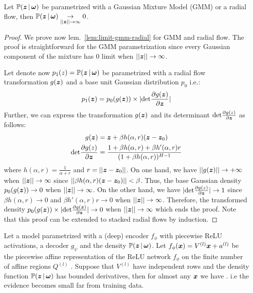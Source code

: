 \begin{lemma}
\label{lem:limit-gmm-radial}
Let $\mathbb{P}(\bm{z} \,|\, \bm{\omega})$ be parametrized with a Gaussian Mixture Model (GMM) or a radial flow, then $\mathbb{P}(\bm{z} \,|\, \bm{\omega})\underset{||\bm{z}|| \rightarrow \infty}{\rightarrow} 0$.
\end{lemma}
\begin{proof}
We prove now lem.~\ref{lem:limit-gmm-radial} for GMM and radial flow. The proof is straightforward for the GMM parametrization since every Gaussian component of the mixture has $0$ limit when $||\bm{z}|| \rightarrow \infty$.

Let denote now $p_1(z) = \mathbb{P}(\bm{z} \,|\, \bm{\omega})$ be parametrized with a radial flow transformation $g(\bm{z})$ and a base unit Gaussian distribution $p_0$ i.e.:
\begin{align*}
    p_1(\bm{z}) = p_0(g(\bm{z})) \times |\text{det}\frac{\partial g(\bm{z})}{\partial\bm{z}}|
\end{align*}
Further, we can express the transformation $g(\bm{z})$ and its determinant $\text{det}\frac{\partial g(z)}{\partial\bm{z}}$ as follows:
\begin{align*}
    g(\bm{z}) &= \bm{z} + \beta h(\alpha, r) (\bm{z} - \bm{z}_0)\\
    \text{det}\frac{\partial g(z)}{\partial\bm{z}} &= \frac{1+\beta h(\alpha, r)+\beta h'(\alpha, r)r}{(1 + \beta h(\alpha, r))^{H-1}}
\end{align*}
where $h(\alpha, r) =\frac{1}{\alpha + r}$ and $r=||\bm{z} - \bm{z}_0||$. On one hand, we have $||g(\bm{z})|| \rightarrow +\infty$ when $||\bm{z}|| \rightarrow \infty$ since $||\beta h(\alpha, r) (\bm{z} - \bm{z}_0)|| < \beta$. Thus, the base Gaussian density $p_0(g(\bm{z}))\rightarrow 0$ when $||\bm{z}|| \rightarrow \infty$. On the other hand, we have $|\text{det}\frac{\partial g(z)}{\partial\bm{z}}|\rightarrow 1$ since $\beta h(\alpha, r) \rightarrow 0$ and $\beta h'(\alpha, r)r \rightarrow 0$ when $||\bm{z}|| \rightarrow \infty$. Therefore, the transformed density $p_0(g(\bm{z})) \times |\text{det}\frac{\partial g(\bm{z})}{\partial\bm{z}}| \rightarrow 0$ when $||\bm{z}|| \rightarrow \infty$ which ends the proof. Note that this proof can be extended to stacked radial flows by induction.
\end{proof}

\begin{theorem*}
Let a \NatPNacro{} model parametrized with a (deep) encoder $f_{\phi}$ with piecewise ReLU activations, a decoder $g_{\psi}$ and the density $\mathbb{P}(\bm{z} \,|\, \bm{\omega})$. Let $f_{\phi}(\bm{x})= V^{(l)}\bm{x} + a^{(l)}$ be the piecewise affine representation of the ReLU network $f_{\phi}$ on the finite number of affine regions $Q^{(l)}$ \citep{understanding-nn-relu}. Suppose that $V^{(l)}$ have independent rows and the density function $\mathbb{P}(\bm{z} \,|\, \bm{\omega})$ has bounded derivatives, then for almost any $\bm{x}$ we have . i.e the evidence becomes small far from training data.
\end{theorem*}


